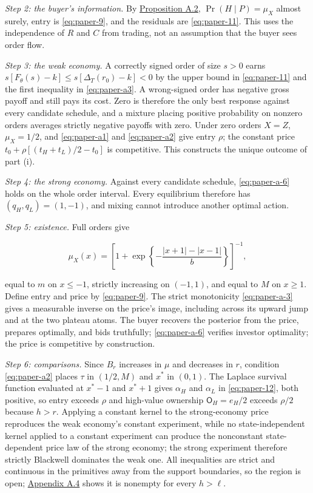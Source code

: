 \documentclass[
  12pt,
]{article}
\begin{document}
\emph{Step 2: the buyer's information.} By
\hyperref[result-proposition-a-2]{Proposition A.2},
\(\Pr(H\mid P)=\mu_X\) almost surely, entry is \eqref{eq:paper-9}, and
the residuals are \eqref{eq:paper-11}. This uses the independence of
\(R\) and \(C\) from trading, not an assumption that the buyer sees
order flow.

\emph{Step 3: the weak economy.} A correctly signed order of size
\(s>0\) earns \(s[F_\theta(s)-k]\le s[\Delta_T(r_0)-k]<0\) by the upper
bound in \eqref{eq:paper-11} and the first inequality in
\eqref{eq:paper-a3}. A wrong-signed order has negative gross payoff and
still pays its cost. Zero is therefore the only best response against
every candidate schedule, and a mixture placing positive probability on
nonzero orders averages strictly negative payoffs with zero. Under zero
orders \(X=Z\), \(\mu_X=1/2\), and \eqref{eq:paper-a1} and
\eqref{eq:paper-a2} give entry \(\rho\); the constant price
\(t_0+\rho[(t_H+t_L)/2-t_0]\) is competitive. This constructs the unique
outcome of part (i).

\emph{Step 4: the strong economy.} Against every candidate schedule,
\eqref{eq:paper-a-6} holds on the whole order interval. Every
equilibrium therefore has \((q_H,q_L)=(1,-1)\), and mixing cannot
introduce another optimal action.

\emph{Step 5: existence.} Full orders give

\[
\mu_X(x)=\left[1+\exp\left\{-\frac{|x+1|-|x-1|}{b}\right\}\right]^{-1},
\tag{A.8}\label{eq:paper-a-8}
\]

equal to \(m\) on \(x\le-1\), strictly increasing on \((-1,1)\), and
equal to \(M\) on \(x\ge1\). Define entry and price by
\eqref{eq:paper-9}. The strict monotonicity \eqref{eq:paper-a-3} gives a
measurable inverse on the price's image, including across its upward
jump and at the two plateau atoms. The buyer recovers the posterior from
the price, prepares optimally, and bids truthfully; \eqref{eq:paper-a-6}
verifies investor optimality; the price is competitive by construction.

\emph{Step 6: comparisons.} Since \(B_r\) increases in \(\mu\) and
decreases in \(r\), condition \eqref{eq:paper-a2} places \(\tau\) in
\((1/2,M)\) and \(x^*\) in \((0,1)\). The Laplace survival function
evaluated at \(x^*-1\) and \(x^*+1\) gives \(\alpha_H\) and \(\alpha_L\)
in \eqref{eq:paper-12}, both positive, so entry exceeds \(\rho\) and
high-value ownership \(\mathsf O_H=e_H/2\) exceeds \(\rho/2\) because
\(h>r\). Applying a constant kernel to the strong-economy price
reproduces the weak economy's constant experiment, while no
state-independent kernel applied to a constant experiment can produce
the nonconstant state-dependent price law of the strong economy; the
strong experiment therefore strictly Blackwell dominates the weak one.
All inequalities are strict and continuous in the primitives away from
the support boundaries, so the region is open;
\hyperref[pa-calculations]{Appendix A.4} shows it is nonempty for every
\(h>\ell\).
\end{document}
